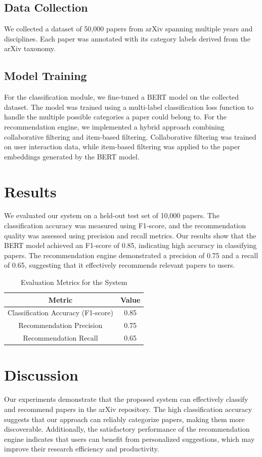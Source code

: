 \documentclass{article}
\begin{document}
\subsection{Data Collection}
We collected a dataset of 50,000 papers from arXiv spanning multiple years and disciplines. Each paper was annotated with its category labels derived from the arXiv taxonomy.

\subsection{Model Training}
For the classification module, we fine-tuned a BERT model on the collected dataset. The model was trained using a multi-label classification loss function to handle the multiple possible categories a paper could belong to. For the recommendation engine, we implemented a hybrid approach combining collaborative filtering and item-based filtering. Collaborative filtering was trained on user interaction data, while item-based filtering was applied to the paper embeddings generated by the BERT model.

\section{Results}
We evaluated our system on a held-out test set of 10,000 papers. The classification accuracy was measured using F1-score, and the recommendation quality was assessed using precision and recall metrics. Our results show that the BERT model achieved an F1-score of 0.85, indicating high accuracy in classifying papers. The recommendation engine demonstrated a precision of 0.75 and a recall of 0.65, suggesting that it effectively recommends relevant papers to users.

\begin{table}[ht]
\centering
\begin{tabular}{|c|c|}
\hline
\textbf{Metric} & \textbf{Value} \\
\hline
Classification Accuracy (F1-score) & 0.85 \\
\hline
Recommendation Precision & 0.75 \\
\hline
Recommendation Recall & 0.65 \\
\hline
\end{tabular}
\caption{Evaluation Metrics for the System}
\label{tab:evaluation_metrics}
\end{table}

\section{Discussion}
Our experiments demonstrate that the proposed system can effectively classify and recommend papers in the arXiv repository. The high classification accuracy suggests that our approach can reliably categorize papers, making them more discoverable. Additionally, the satisfactory performance of the recommendation engine indicates that users can benefit from personalized suggestions, which may improve their research efficiency and productivity.
\end{document}
